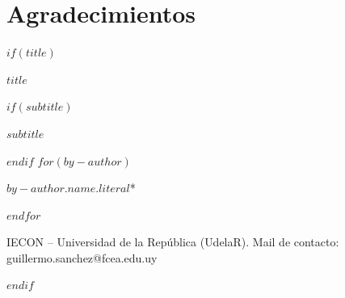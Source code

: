 \section*{Agradecimientos}
\thispagestyle{empty}

$if(title)$
\cleardoublepage
\thispagestyle{empty}
{\centering
{\huge\bfseries $title$ \par}
$if(subtitle)$
\vspace{1ex}
{\Large\bfseries $subtitle$ \par}
$endif$
\vspace{3ex}
$for(by-author)$
{\large $by-author.name.literal$*\par}
$endfor$
\vspace{3ex}
}
{\begin{quote}
{\footnotesize

}
\end{quote}\par}
{\vfill}
{\footnotesize * IECON -- Universidad de la República (UdelaR). 
Mail de contacto: guillermo.sanchez@fcea.edu.uy\par}
{\small\par}
$endif$
